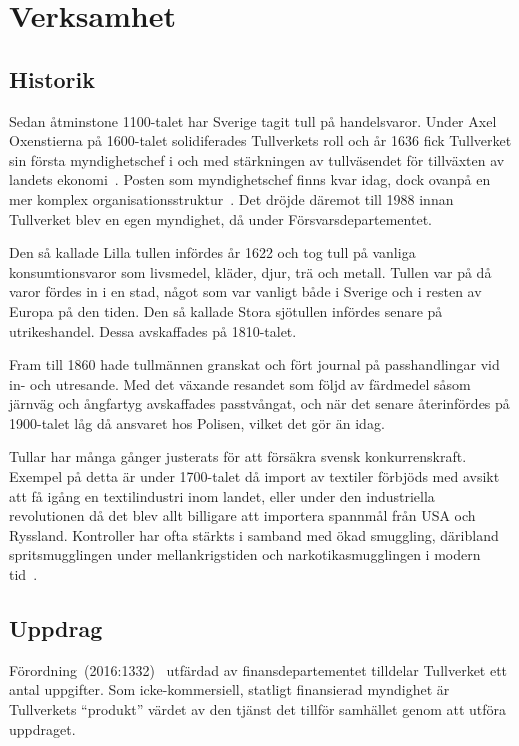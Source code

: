 \section{Verksamhet}

\subsection{Historik}

Sedan åtminstone 1100-talet har Sverige tagit tull på handelsvaror. Under
Axel Oxenstierna på 1600-talet solidiferades Tullverkets roll och år 1636
fick Tullverket sin första myndighetschef i och med stärkningen av tullväsendet
för tillväxten av landets ekonomi~\cite{wikipedia}. Posten som myndighetschef
finns kvar idag, dock ovanpå en mer komplex
organisationsstruktur~\cite{forordning}. Det dröjde däremot till 1988 innan
Tullverket blev en egen myndighet, då under Försvarsdepartementet.

Den så kallade Lilla tullen infördes år 1622 och tog tull på vanliga
konsumtionsvaror som livsmedel, kläder, djur, trä och metall. Tullen var på
då varor fördes in i en stad, något som var vanligt både i Sverige och i resten
av Europa på den tiden. Den så kallade Stora sjötullen infördes senare på
utrikeshandel. Dessa avskaffades på 1810-talet.

Fram till 1860 hade tullmännen granskat och fört journal på passhandlingar vid
in- och utresande. Med det växande resandet som följd av färdmedel såsom
järnväg och ångfartyg avskaffades passtvångat, och när det senare återinfördes
på 1900-talet låg då ansvaret hos Polisen, vilket det gör än idag.

Tullar har många gånger justerats för att försäkra svensk konkurrenskraft.
Exempel på detta är under 1700-talet då import av textiler förbjöds med avsikt
att få igång en textilindustri inom landet, eller under den industriella
revolutionen då det blev allt billigare att importera spannmål från USA
och Ryssland.
%
Kontroller har ofta stärkts i samband med ökad smuggling, däribland
spritsmugglingen under mellankrigstiden och narkotikasmugglingen i modern
tid~\cite{historik}.

\subsection{Uppdrag}

Förordning~(2016:1332)~\cite{forordning} utfärdad av finansdepartementet
tilldelar Tullverket ett antal uppgifter. Som icke-kommersiell, statligt
finansierad myndighet är Tullverkets ``produkt'' värdet av den tjänst det
tillför samhället genom att utföra uppdraget.

